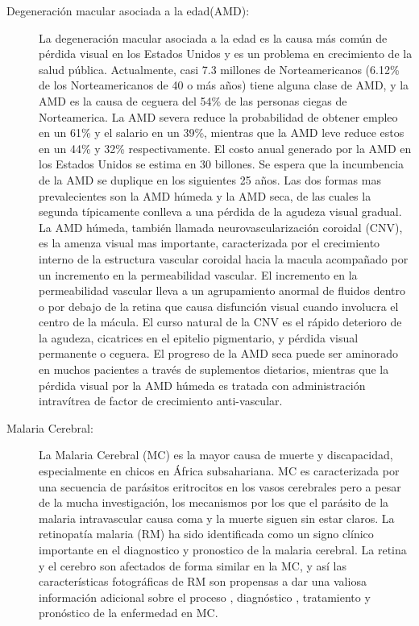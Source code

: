 \begin{description}
    \item[Degeneración macular asociada a la edad(AMD):]La degeneración macular asociada a la edad es la causa más común de pérdida visual en los Estados Unidos y es un problema en crecimiento de la salud pública. Actualmente, casi 7.3 millones de Norteamericanos (6.12\% de los Norteamericanos de 40 o más años) tiene alguna clase de AMD, y la AMD es la causa de ceguera del 54\% de las personas ciegas de Norteamerica. La AMD severa reduce la probabilidad de obtener empleo en un 61\% y el salario en un 39\%, mientras que la AMD leve reduce estos en un 44\% y 32\% respectivamente. El costo anual generado por la AMD en los Estados Unidos se estima en 30 billones. Se espera que la incumbencia de la AMD se duplique en los siguientes 25 años. Las dos formas mas prevalecientes son la AMD húmeda y la AMD seca, de las cuales la segunda típicamente conlleva a una pérdida de la agudeza visual gradual. La AMD húmeda, también llamada neurovascularización coroidal (CNV), es la amenza visual mas importante, caracterizada por el crecimiento interno de la estructura vascular coroidal hacia la macula acompañado por un incremento en la permeabilidad vascular. El incremento en la permeabilidad vascular lleva a un agrupamiento anormal de fluidos dentro o por debajo de la retina que causa disfunción visual cuando involucra el centro de la mácula. El curso natural de la CNV es el rápido deterioro de la agudeza, cicatrices en el epitelio pigmentario, y pérdida visual permanente o ceguera. El progreso de la AMD seca puede ser aminorado en muchos pacientes a través de suplementos dietarios, mientras que la pérdida visual por la AMD húmeda es tratada con administración intravítrea de factor de crecimiento anti-vascular.
     
     
\item[Malaria Cerebral:]La Malaria Cerebral (MC) es la mayor causa de muerte y discapacidad, especialmente en chicos en África subsahariana. MC es caracterizada por una secuencia de parásitos eritrocitos
en los vasos cerebrales pero a pesar de la mucha  investigación, los mecanismos por los que el parásito de la malaria intravascular causa coma y la muerte siguen sin estar claros.
La retinopatía  malaria (RM) ha sido identificada como un signo clínico importante en el diagnostico y pronostico de la malaria cerebral. La retina y el cerebro son afectados de forma similar en la MC, y así las características fotográficas de RM son propensas a dar una valiosa información adicional sobre el proceso , diagnóstico , tratamiento y pronóstico de la enfermedad en MC.


\end{description}
